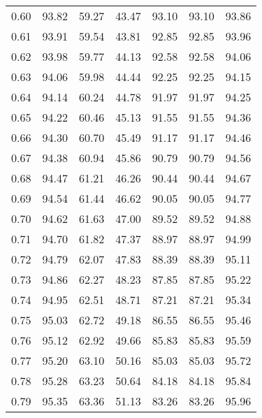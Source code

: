 \begin{tabular}{|c|c|c|c|c|c|c|}
      0.60 &     93.82 &     59.27 &      43.47 &   93.10 &      93.10 &         93.86 \\
      0.61 &     93.91 &     59.54 &      43.81 &   92.85 &      92.85 &         93.96 \\
      0.62 &     93.98 &     59.77 &      44.13 &   92.58 &      92.58 &         94.06 \\
      0.63 &     94.06 &     59.98 &      44.44 &   92.25 &      92.25 &         94.15 \\
      0.64 &     94.14 &     60.24 &      44.78 &   91.97 &      91.97 &         94.25 \\
      0.65 &     94.22 &     60.46 &      45.13 &   91.55 &      91.55 &         94.36 \\
      0.66 &     94.30 &     60.70 &      45.49 &   91.17 &      91.17 &         94.46 \\
      0.67 &     94.38 &     60.94 &      45.86 &   90.79 &      90.79 &         94.56 \\
      0.68 &     94.47 &     61.21 &      46.26 &   90.44 &      90.44 &         94.67 \\
      0.69 &     94.54 &     61.44 &      46.62 &   90.05 &      90.05 &         94.77 \\
      0.70 &     94.62 &     61.63 &      47.00 &   89.52 &      89.52 &         94.88 \\
      0.71 &     94.70 &     61.82 &      47.37 &   88.97 &      88.97 &         94.99 \\
      0.72 &     94.79 &     62.07 &      47.83 &   88.39 &      88.39 &         95.11 \\
      0.73 &     94.86 &     62.27 &      48.23 &   87.85 &      87.85 &         95.22 \\
      0.74 &     94.95 &     62.51 &      48.71 &   87.21 &      87.21 &         95.34 \\
      0.75 &     95.03 &     62.72 &      49.18 &   86.55 &      86.55 &         95.46 \\
      0.76 &     95.12 &     62.92 &      49.66 &   85.83 &      85.83 &         95.59 \\
      0.77 &     95.20 &     63.10 &      50.16 &   85.03 &      85.03 &         95.72 \\
      0.78 &     95.28 &     63.23 &      50.64 &   84.18 &      84.18 &         95.84 \\
      0.79 &     95.35 &     63.36 &      51.13 &   83.26 &      83.26 &         95.96 \\

\end{tabular}
